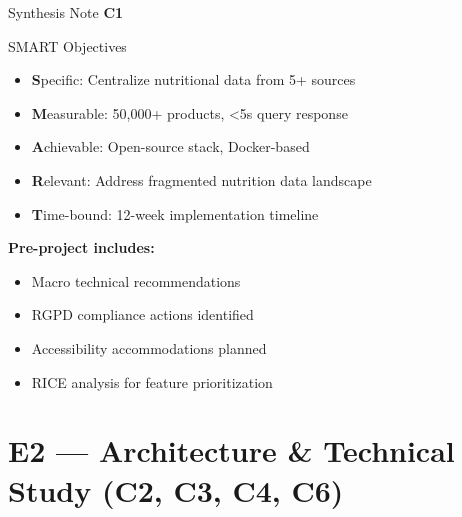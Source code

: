 \documentclass[aspectratio=169, 10pt]{beamer}
\newcommand{\competency}[1]{\textbf{\color{ntblue}#1}}
\begin{document}
\begin{frame}{Synthesis Note \competency{C1}}
\begin{block}{SMART Objectives}
  \begin{itemize}
    \item \textbf{S}pecific: Centralize nutritional data from 5+ sources
    \item \textbf{M}easurable: 50,000+ products, <5s query response
    \item \textbf{A}chievable: Open-source stack, Docker-based
    \item \textbf{R}elevant: Address fragmented nutrition data landscape
    \item \textbf{T}ime-bound: 12-week implementation timeline
  \end{itemize}
\end{block}

\vspace{0.3cm}
\textbf{Pre-project includes:}
\begin{itemize}
  \item Macro technical recommendations
  \item RGPD compliance actions identified
  \item Accessibility accommodations planned
  \item RICE analysis for feature prioritization
\end{itemize}

\end{frame}

\section{E2 --- Architecture \& Technical Study (C2, C3, C4, C6)}
\end{document}
